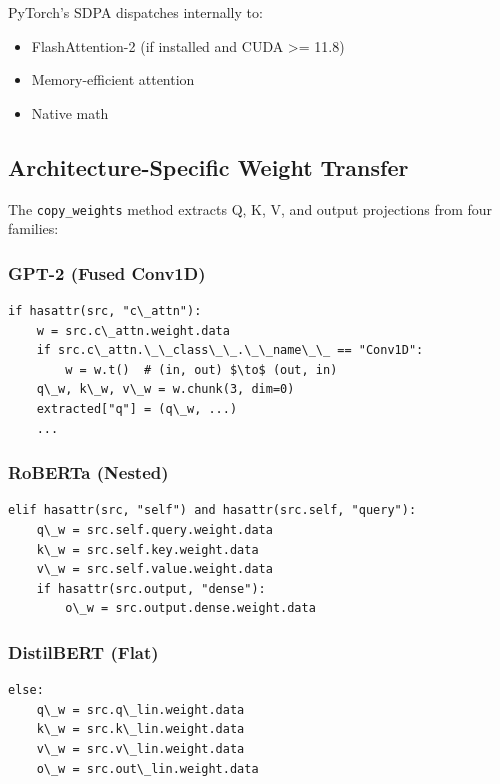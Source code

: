 PyTorch's SDPA dispatches internally to:
\begin{itemize}
\item FlashAttention-2 (if installed and CUDA \textgreater{}= 11.8)
\item Memory-efficient attention
\item Native math

\end{itemize}
\subsection{Architecture-Specific Weight Transfer}

The \texttt{copy\_weights} method extracts Q, K, V, and output projections from four 
families:

\subsubsection{GPT-2 (Fused Conv1D)}

\begin{lstlisting}
if hasattr(src, "c\_attn"):
    w = src.c\_attn.weight.data
    if src.c\_attn.\_\_class\_\_.\_\_name\_\_ == "Conv1D":
        w = w.t()  # (in, out) $\to$ (out, in)
    q\_w, k\_w, v\_w = w.chunk(3, dim=0)
    extracted["q"] = (q\_w, ...)
    ...
\end{lstlisting}

\subsubsection{RoBERTa (Nested)}

\begin{lstlisting}
elif hasattr(src, "self") and hasattr(src.self, "query"):
    q\_w = src.self.query.weight.data
    k\_w = src.self.key.weight.data
    v\_w = src.self.value.weight.data
    if hasattr(src.output, "dense"):
        o\_w = src.output.dense.weight.data
\end{lstlisting}

\subsubsection{DistilBERT (Flat)}

\begin{lstlisting}
else:
    q\_w = src.q\_lin.weight.data
    k\_w = src.k\_lin.weight.data
    v\_w = src.v\_lin.weight.data
    o\_w = src.out\_lin.weight.data
\end{lstlisting}

